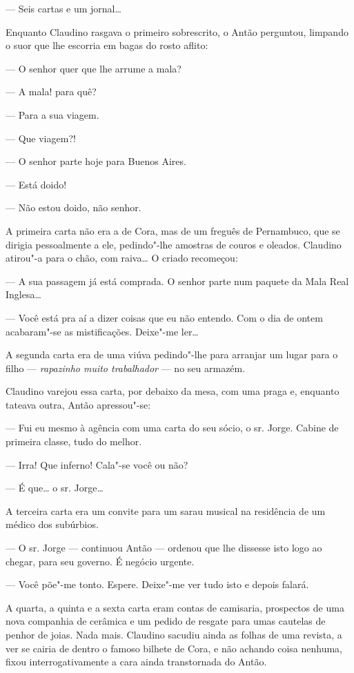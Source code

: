 --- Seis cartas e um jornal\ldots{}

Enquanto Claudino rasgava o primeiro sobrescrito, o Antão perguntou,
limpando o suor que lhe escorria em bagas do rosto aflito:

--- O senhor quer que lhe arrume a mala?

--- A mala! para quê?

--- Para a sua viagem.

--- Que viagem?!

--- O senhor parte hoje para Buenos Aires.

--- Está doido!

--- Não estou doido, não senhor.

A primeira carta não era a de Cora, mas de um freguês de Pernambuco, que
se dirigia pessoalmente a ele, pedindo"-lhe amostras de couros e oleados.
Claudino atirou"-a para o chão, com raiva\ldots{} O criado recomeçou:

--- A sua passagem já está comprada. O senhor parte num paquete da Mala
Real Inglesa\ldots{}

--- Você está pra aí a dizer coisas que eu não entendo. Com o dia de
ontem acabaram"-se as mistificações. Deixe"-me ler\ldots{}

A segunda carta era de uma viúva pedindo"-lhe para arranjar um lugar para
o filho --- \emph{rapazinho muito trabalhador} --- no seu armazém.

Claudino varejou essa carta, por debaixo da mesa, com uma praga e,
enquanto tateava outra, Antão apressou"-se:

--- Fui eu mesmo à agência com uma carta do seu sócio, o sr. Jorge.
Cabine de primeira classe, tudo do melhor.

--- Irra! Que inferno! Cala"-se você ou não?

--- É que\ldots{} o sr. Jorge\ldots{}

A terceira carta era um convite para um sarau musical na residência de
um médico dos subúrbios.

--- O sr. Jorge --- continuou Antão --- ordenou que lhe dissesse isto
logo ao chegar, para seu governo. É negócio urgente.

--- Você põe"-me tonto. Espere. Deixe"-me ver tudo isto e depois falará.

A quarta, a quinta e a sexta carta eram contas de camisaria, prospectos
de uma nova companhia de cerâmica e um pedido de resgate para umas
cautelas de penhor de joias. Nada mais. Claudino sacudiu ainda as folhas
de uma revista, a ver se cairia de dentro o famoso bilhete de Cora, e
não achando coisa nenhuma, fixou interrogativamente a cara ainda
transtornada do Antão.

